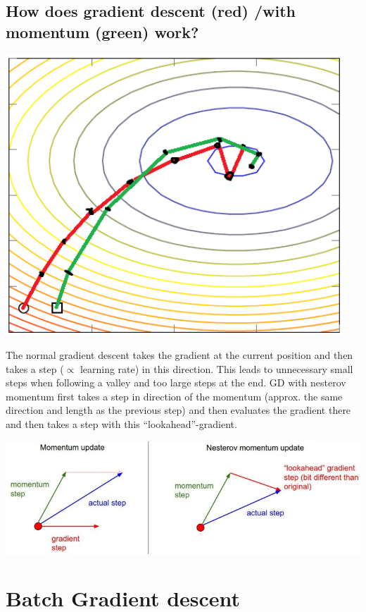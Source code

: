 \subsection{How does gradient descent (red) /with momentum (green) work? }
\begin{minipage}{0.4\textwidth}
\includegraphics[width=0.95\textwidth]{./img/gradient.png}
\end{minipage}\begin{minipage}{0.6\textwidth}The normal gradient descent takes the gradient at the current position and then takes a step ($\propto$ learning rate) in this direction. This leads to unnecessary small steps when following a valley and too large steps at the end. GD with nesterov momentum first takes a step in direction of the momentum (approx. the same direction and length as the previous step) and then evaluates the gradient there and then takes a step with this ``lookahead''-gradient.
\end{minipage}
\includegraphics[width=\textwidth]{./img/nesterov.jpeg}
%
\section{Batch Gradient descent}
